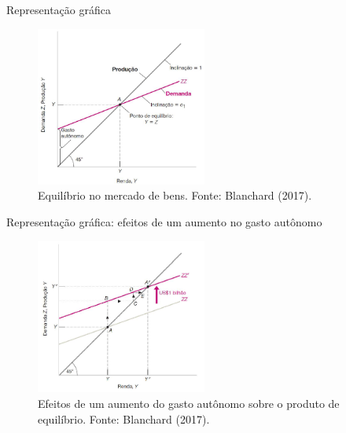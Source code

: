 \documentclass[10pt]{beamer}
\begin{document}
\begin{frame}{Representação gráfica}
    \begin{figure}
        \centering
        \includegraphics[width=0.5\textwidth]{./figures/aula5_fig8.PNG}
        \caption{Equilíbrio no mercado de bens. Fonte: Blanchard (2017).}
        \label{fig4}
    \end{figure}
\end{frame}

\begin{frame}{Representação gráfica: efeitos de um aumento no gasto autônomo}
\begin{figure}
    \centering
    \includegraphics[width=0.5\textwidth]{./figures/aula5_fig9.PNG}
    \caption{Efeitos de um aumento do gasto autônomo sobre o produto de equilíbrio. Fonte: Blanchard (2017).}
    \label{fig5}
\end{figure}
\end{frame}
\end{document}
